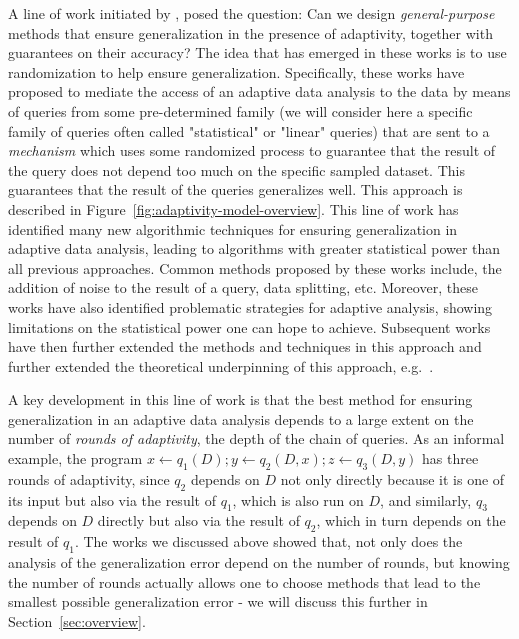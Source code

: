 A line of work initiated by \citet{DworkFHPRR15}, \citet{HardtU14} posed the question: Can we design \emph{general-purpose} methods that ensure generalization in the presence of adaptivity, together with guarantees on their accuracy?  The idea that has emerged in these works is to use randomization to help ensure generalization. Specifically, these works have proposed to mediate the access of an adaptive data analysis to the data by means of queries from some pre-determined family (we will consider here a specific family of queries often called "statistical" or "linear" queries) that are sent to a  \emph{mechanism} which uses some randomized process to guarantee that the result of the query does not depend too much on the specific
sampled dataset. This guarantees that the result of the queries generalizes well. This approach is described in Figure~\ref{fig:adaptivity-model-overview}.  
This line of work has identified many new algorithmic techniques for ensuring generalization in adaptive data analysis, leading to algorithms with greater statistical power than all previous approaches. Common methods proposed by these works include, the addition of noise to the result of a query, data splitting, etc. Moreover, these works have also identified problematic strategies for adaptive analysis, showing limitations on the statistical power one can hope to achieve. Subsequent works have then further extended the methods and techniques in this approach and further extended the theoretical underpinning of this approach, e.g.~\cite{dwork2015reusable,dwork2015generalization,BassilyNSSSU16,UllmanSNSS18,FeldmanS17,jung2019new,SteinkeZ20,RogersRSSTW20}.
%

A key development in this line of work is that the best method for ensuring generalization in an adaptive data analysis depends to a large extent on the number of \emph{rounds of adaptivity}, the depth of the chain of queries. As an informal example, the program $x \leftarrow q_1(D);y \leftarrow q_2(D,x);z \leftarrow q_3(D,y)$ has three rounds of adaptivity, since $q_2$  depends on $D$ not only directly because it is one of its input but also via the result of $q_1$, which is also run on $D$, and similarly,  $q_3$ depends on $D$ directly but also via the result of $q_2$, which in turn depends on the result of $q_1$. The works we discussed above showed that, not only does the analysis of the generalization error depend on the number of rounds, but knowing the number of rounds actually allows one to choose methods that lead to the smallest possible generalization error - we will discuss this further in Section~\ref{sec:overview}. 

